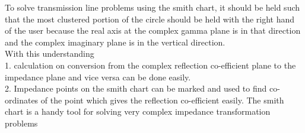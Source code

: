 To solve transmission line problems using the smith chart, it should be held such that the most clustered portion of the circle should be held with the right hand of the user because the real axis at the complex gamma plane is in that direction and the complex imaginary plane is in the vertical direction.\\
With this understanding\\ 
1.	calculation on conversion from the complex reflection co-efficient plane to the impedance plane and vice versa can be done easily.\\ 
2.	Impedance points on the smith chart can be marked and used to find co-ordinates of the point which gives the reflection co-efficient easily.
The smith chart is a handy tool for solving very complex impedance transformation problems
